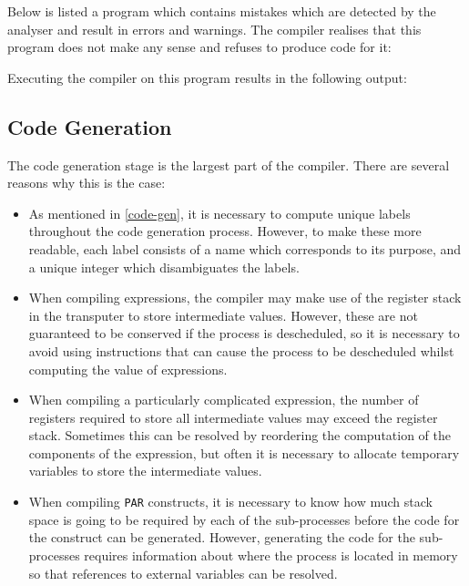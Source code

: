 Below is listed a program which contains mistakes which are detected by the
analyser and result in errors and warnings. The compiler realises that this
program does not make any sense and refuses to produce code for it:

Executing the compiler on this program results in the following output:


\subsection{Code Generation}

The code generation stage is the largest part of the compiler. There are several
reasons why this is the case:

\begin{itemize}
  \item
    As mentioned in \ref{code-gen}, it is necessary to compute unique labels
    throughout the code generation process. However, to make these more
    readable, each label consists of a name which corresponds to its purpose,
    and a unique integer which disambiguates the labels.
  \item
    When compiling expressions, the compiler may make use of the register stack
    in the transputer to store intermediate values. However, these are not
    guaranteed to be conserved if the process is descheduled, so it is necessary
    to avoid using instructions that can cause the process to be descheduled
    whilst computing the value of expressions.
  \item
    When compiling a particularly complicated expression, the number of
    registers required to store all intermediate values may exceed the register
    stack. Sometimes this can be resolved by reordering the computation of the
    components of the expression, but often it is necessary to allocate
    temporary variables to store the intermediate values.
  \item
    When compiling \texttt{PAR} constructs, it is necessary to know how much
    stack space is going to be required by each of the sub-processes before the
    code for the construct can be generated. However, generating the code for
    the sub-processes requires information about where the process is located in
    memory so that references to external variables can be resolved.
    

\end{itemize}
